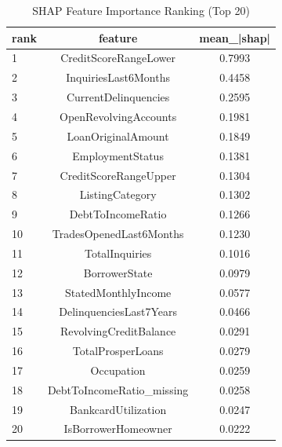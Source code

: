 \begin{table}
\centering
\caption{SHAP Feature Importance Ranking (Top 20)}
\label{tab:shap_ranking}
\begin{tabular}{lcc}
\toprule
rank & feature & mean_|shap| \\
\midrule
1 & CreditScoreRangeLower & 0.7993 \\
2 & InquiriesLast6Months & 0.4458 \\
3 & CurrentDelinquencies & 0.2595 \\
4 & OpenRevolvingAccounts & 0.1981 \\
5 & LoanOriginalAmount & 0.1849 \\
6 & EmploymentStatus & 0.1381 \\
7 & CreditScoreRangeUpper & 0.1304 \\
8 & ListingCategory & 0.1302 \\
9 & DebtToIncomeRatio & 0.1266 \\
10 & TradesOpenedLast6Months & 0.1230 \\
11 & TotalInquiries & 0.1016 \\
12 & BorrowerState & 0.0979 \\
13 & StatedMonthlyIncome & 0.0577 \\
14 & DelinquenciesLast7Years & 0.0466 \\
15 & RevolvingCreditBalance & 0.0291 \\
16 & TotalProsperLoans & 0.0279 \\
17 & Occupation & 0.0259 \\
18 & DebtToIncomeRatio_missing & 0.0258 \\
19 & BankcardUtilization & 0.0247 \\
20 & IsBorrowerHomeowner & 0.0222 \\
\bottomrule
\end{tabular}
\end{table}
